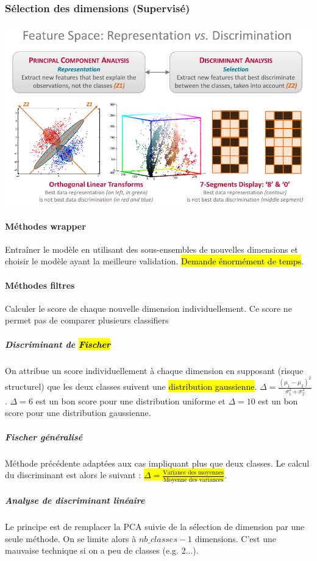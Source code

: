 \documentclass[letterpaper, 12pt]{article}
\begin{document}
			\subsubsection{Sélection des dimensions (Supervisé)}
				\begin{center}
					\includegraphics[width=\textwidth]{Images/pca}
				\end{center}
				\paragraph{Méthodes wrapper} Entraîner le modèle en utilisant des sous-ensembles de nouvelles dimensions et choisir
					le modèle ayant la meilleure validation. \hl{Demande énormément de temps}.
				\paragraph{Méthodes filtres} Calculer le score de chaque nouvelle dimension individuellement. Ce score ne permet pas de
					comparer plusieurs classifiers
					\subparagraph{Discriminant de \hl{Fischer}} On attribue un score individuellement à chaque dimension en supposant 
						(risque	structurel) que les deux classes suivent une \hl{distribution gaussienne}. 
						$\Delta = \frac{(\mu_1 - \mu_2)^2}{\sigma_1^2 + \sigma_2^2}$. $\Delta = 6$ est un bon score pour une 
						distribution uniforme et $\Delta = 10$ est un bon score pour une distribution gaussienne.
					\subparagraph{Fischer généralisé} Méthode précédente adaptées aux cas impliquant plus que deux classes.
						Le calcul du discriminant est alors le suivant : 
						\hl{$\Delta = \frac{\text{Variance des moyennes}}{\text{Moyenne des variances}}$}.
					\subparagraph{Analyse de discriminant linéaire} Le principe est de remplacer la PCA suivie de la sélection de 
						dimension par une seule méthode. On se limite alors à $nb\_classes-1$ dimensions. C'est une mauvaise 
						technique si on a peu de classes (e.g. 2...).
%
\end{document}

